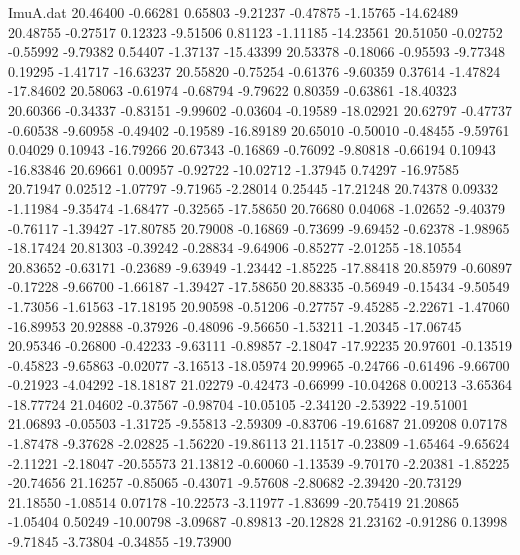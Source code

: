 \begin{filecontents}{ImuA.dat}
  20.46400   -0.66281    0.65803   -9.21237   -0.47875   -1.15765  -14.62489
  20.48755   -0.27517    0.12323   -9.51506    0.81123   -1.11185  -14.23561
  20.51050   -0.02752   -0.55992   -9.79382    0.54407   -1.37137  -15.43399
  20.53378   -0.18066   -0.95593   -9.77348    0.19295   -1.41717  -16.63237
  20.55820   -0.75254   -0.61376   -9.60359    0.37614   -1.47824  -17.84602
  20.58063   -0.61974   -0.68794   -9.79622    0.80359   -0.63861  -18.40323
  20.60366   -0.34337   -0.83151   -9.99602   -0.03604   -0.19589  -18.02921
  20.62797   -0.47737   -0.60538   -9.60958   -0.49402   -0.19589  -16.89189
  20.65010   -0.50010   -0.48455   -9.59761    0.04029    0.10943  -16.79266
  20.67343   -0.16869   -0.76092   -9.80818   -0.66194    0.10943  -16.83846
  20.69661    0.00957   -0.92722  -10.02712   -1.37945    0.74297  -16.97585
  20.71947    0.02512   -1.07797   -9.71965   -2.28014    0.25445  -17.21248
  20.74378    0.09332   -1.11984   -9.35474   -1.68477   -0.32565  -17.58650
  20.76680    0.04068   -1.02652   -9.40379   -0.76117   -1.39427  -17.80785
  20.79008   -0.16869   -0.73699   -9.69452   -0.62378   -1.98965  -18.17424
  20.81303   -0.39242   -0.28834   -9.64906   -0.85277   -2.01255  -18.10554
  20.83652   -0.63171   -0.23689   -9.63949   -1.23442   -1.85225  -17.88418
  20.85979   -0.60897   -0.17228   -9.66700   -1.66187   -1.39427  -17.58650
  20.88335   -0.56949   -0.15434   -9.50549   -1.73056   -1.61563  -17.18195
  20.90598   -0.51206   -0.27757   -9.45285   -2.22671   -1.47060  -16.89953
  20.92888   -0.37926   -0.48096   -9.56650   -1.53211   -1.20345  -17.06745
  20.95346   -0.26800   -0.42233   -9.63111   -0.89857   -2.18047  -17.92235
  20.97601   -0.13519   -0.45823   -9.65863   -0.02077   -3.16513  -18.05974
  20.99965   -0.24766   -0.61496   -9.66700   -0.21923   -4.04292  -18.18187
  21.02279   -0.42473   -0.66999  -10.04268    0.00213   -3.65364  -18.77724
  21.04602   -0.37567   -0.98704  -10.05105   -2.34120   -2.53922  -19.51001
  21.06893   -0.05503   -1.31725   -9.55813   -2.59309   -0.83706  -19.61687
  21.09208    0.07178   -1.87478   -9.37628   -2.02825   -1.56220  -19.86113
  21.11517   -0.23809   -1.65464   -9.65624   -2.11221   -2.18047  -20.55573
  21.13812   -0.60060   -1.13539   -9.70170   -2.20381   -1.85225  -20.74656
  21.16257   -0.85065   -0.43071   -9.57608   -2.80682   -2.39420  -20.73129
  21.18550   -1.08514    0.07178  -10.22573   -3.11977   -1.83699  -20.75419
  21.20865   -1.05404    0.50249  -10.00798   -3.09687   -0.89813  -20.12828
  21.23162   -0.91286    0.13998   -9.71845   -3.73804   -0.34855  -19.73900

\end{filecontents}
